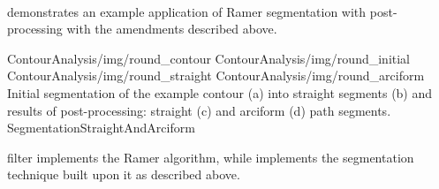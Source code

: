 \paragraph*{}
 demonstrates an example application of Ramer segmentation with post-processing with the amendments described above.

\fourFigures
{ContourAnalysis/img/round_contour}
{ContourAnalysis/img/round_initial}
{ContourAnalysis/img/round_straight}
{ContourAnalysis/img/round_arciform}
{Initial segmentation of the example contour (a) into straight segments (b) and results of post-processing: straight (c) and arciform (d) path segments.}
{SegmentationStraightAndArciform}
{\basicWidth}

\begin{refImpl}
\studio filter  implements the Ramer algorithm, while  implements the segmentation technique built upon it as described above.
\end{refImpl}